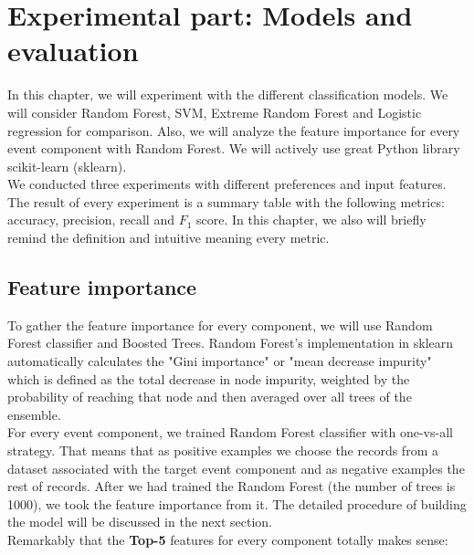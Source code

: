 \chapter{Experimental part: Models and evaluation}
\label{chap:model}
In this chapter, we will experiment with the different classification models. We will consider Random Forest, SVM, Extreme Random Forest \cite{ExtRF} and Logistic regression for comparison. Also, we will analyze the feature importance for every event component with Random Forest. We will actively use great Python library scikit-learn (sklearn).\\

We conducted three experiments with different preferences and input features. The result of every experiment is a summary table with the following metrics: accuracy, precision, recall and $F_1$ score. In this chapter, we also will briefly remind the definition and intuitive meaning every metric.\\

\section{Feature importance}
To gather the feature importance for every component, we will use Random Forest classifier and Boosted Trees. Random Forest's implementation in sklearn automatically calculates the "Gini importance" or "mean decrease impurity" which is defined as the total decrease in node impurity, weighted by the probability of reaching that node and then averaged over all trees of the ensemble.\\

For every event component, we trained Random Forest classifier with one-vs-all strategy. That means that as positive examples we choose the records from a dataset associated with the target event component and as negative examples the rest of records. After we had trained the Random Forest (the number of trees is 1000), we took the feature importance from it. The detailed procedure of building the model will be discussed in the next section.\\

Remarkably that the \textbf{Top-5} features for every component totally makes sense:

